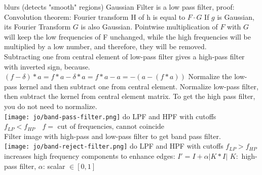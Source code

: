 blurs (detects "smooth" regions) Gaussian Filter is a low pass filter, proof: Convolution theorem: Fourier transform H of h is equal to $F \cdot G$
If $g$ is Gaussian, its Fourier Transform $G$ is also Gaussian.
Pointwise multiplication of $F$ with $G$ will keep the low frequencies of F unchanged, while the high frequencies will be multiplied by a low number, and therefore, they will be removed.  \\
 Subtracting one from central element of low-pass filter gives a high-pass filter with inverted sign, because.\\
$(f - \delta) * a = f * a - \delta * a = f * a - a = - (a - (f * a))$ Normalize the low-pass kernel and then subtract one from central element. Normalize low-pass filter, then subtract the kernel from central element matrix. To get the high pass filter, you do not need to normalize.\\
\texttt{[image: jo/band-pass-filter.png]}
do LPF and HPF with cutoffs $f_{LP} < f_{HP} \quad f = \text{ cut of frequencies, cannot coincide}$\\
Filter image with high-pass and low-pass filter to get band pass filter. \\
 \texttt{[image: jo/band-reject-filter.png]}
do LPF and HPF with cutoffs $f_{LP} > f_{HP}$\\
 increases high frequency components to enhance edges: $I' = I + \alpha |K * I|$ $K:$ high-pass filter, $\alpha$: scalar $\in [0, 1]$